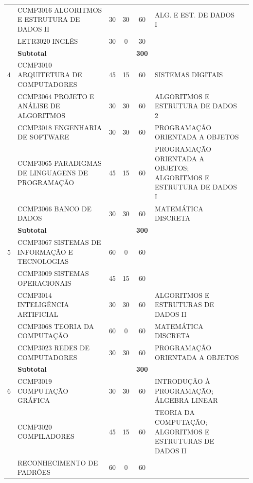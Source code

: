 \documentclass[
	12pt,				%
	openright,			%
  oneside,     %
	a4paper,			%
	chapter=TITLE,		%
	english,			%
	french,				%
	spanish,			%
	brazil				%
	]{abntex2}
\begin{document}
\begin{center}
\begin{tiny}
\begin{longtable}{cp{4.5cm}cccp{2.8cm}p{2.8cm}}
        & CCMP3016 ALGORITMOS E ESTRUTURA DE DADOS II & 30 & 30 & 60 & ALG. E EST. DE DADOS I & \\ \cline{2-7}
        & LETR3020 INGLÊS & 30 & 0 & 30  & &\\ \midrule
        & \multicolumn{3}{l}{\textbf{Subtotal}} & \textbf{300} & & \\ \midrule
    4 
        & CCMP3010 ARQUITETURA DE COMPUTADORES & 45 & 15 & 60 & SISTEMAS DIGITAIS & \\ \cline{2-7}
        & CCMP3064 PROJETO E ANÁLISE DE ALGORITMOS & 30 & 30 & 60 & ALGORITMOS E ESTRUTURA DE DADOS 2 & \\ \cline{2-7}
        & CCMP3018 ENGENHARIA DE SOFTWARE & 30 & 30 & 60 & PROGRAMAÇÃO ORIENTADA A OBJETOS & \\ \cline{2-7}
        & CCMP3065 PARADIGMAS DE LINGUAGENS DE PROGRAMAÇÃO & 45 & 15 & 60 & PROGRAMAÇÃO ORIENTADA A OBJETOS; \newline ALGORITMOS E ESTRUTURA DE DADOS I & \\ \cline{2-7}
        & CCMP3066 BANCO DE DADOS & 30 & 30 & 60 & MATEMÁTICA DISCRETA & \\ \cline{2-7}
        & \multicolumn{3}{l}{\textbf{Subtotal}} & \textbf{300} & & \\ \midrule
    5 
        & CCMP3067 SISTEMAS DE INFORMAÇÃO E TECNOLOGIAS & 60 & 0 & 60 & & \\ \cline{2-7}
        & CCMP3009 SISTEMAS OPERACIONAIS & 45 & 15 & 60 & & \\ \cline{2-7}
        & CCMP3014 INTELIGÊNCIA ARTIFICIAL & 30 & 30 & 60 & ALGORITMOS E ESTRUTURAS DE DADOS II & \\ \cline{2-7}
        & CCMP3068 TEORIA DA COMPUTAÇÃO & 60 & 0 & 60 & MATEMÁTICA DISCRETA & \\ \cline{2-7}
        & CCMP3023 REDES DE COMPUTADORES & 30 & 30 & 60 & PROGRAMAÇÃO ORIENTADA A OBJETOS & \\ \midrule
        & \multicolumn{3}{l}{\textbf{Subtotal}} & \textbf{300} & & \\ \midrule
    6 
        & CCMP3019 COMPUTAÇÃO GRÁFICA & 30 & 30 & 60 & INTRODUÇÃO À PROGRAMAÇÃO; \newline ÁLGEBRA LINEAR & \\ \cline{2-7}
        & CCMP3020 COMPILADORES & 45 & 15 & 60 & TEORIA DA COMPUTAÇÃO; \newline ALGORITMOS E ESTRUTURAS DE DADOS II & \\ \cline{2-7}
        & RECONHECIMENTO DE PADRÕES & 60 & 0 & 60 &  & \\ \cline{2-7}

\end{longtable}
\end{tiny}
\end{center}
\end{document}
